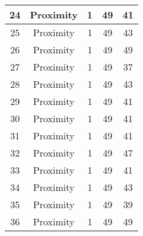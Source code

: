 \documentclass[results.tex]{subfiles}
\begin{document}
\begin{center}
\begin{tabular}{| c || c | c | c | c |}
            \hline
            24                      & Proximity                    & 1                      & 49                      & 41                   \\
            \hline
            25                      & Proximity                    & 1                      & 49                      & 43                   \\
            \hline
            26                      & Proximity                    & 1                      & 49                      & 49                   \\
            \hline
            27                      & Proximity                    & 1                      & 49                      & 37                   \\
            \hline
            28                      & Proximity                    & 1                      & 49                      & 43                   \\
            \hline
            29                      & Proximity                    & 1                      & 49                      & 41                   \\
            \hline
            30                      & Proximity                    & 1                      & 49                      & 41                   \\
            \hline
            31                      & Proximity                    & 1                      & 49                      & 41                   \\
            \hline
            32                      & Proximity                    & 1                      & 49                      & 47                   \\
            \hline
            33                      & Proximity                    & 1                      & 49                      & 41                   \\
            \hline
            34                      & Proximity                    & 1                      & 49                      & 43                   \\
            \hline
            35                      & Proximity                    & 1                      & 49                      & 39                   \\
            \hline
            36                      & Proximity                    & 1                      & 49                      & 49                   \\

\end{tabular}
\end{center}
\end{document}
